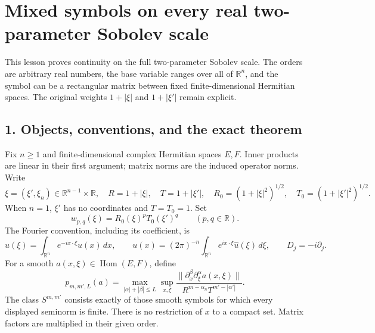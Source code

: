 \documentclass[
  11pt,
]{article}
\author{}
\date{}
\makeatletter
\let\ReaderOriginalAnchorStart\hyper@anchorstart
\let\ReaderOriginalAnchorEnd\hyper@anchorend
\let\ReaderPendingAliases\@empty
\def\ReaderArmAliases#1{\gdef\ReaderPendingAliases{#1}}
\def\hyper@anchorstart#1{\ReaderIfNativeAnchorTF{#1}{\ReaderPendingAliases\global\let\ReaderPendingAliases\@empty}{}\ReaderOriginalAnchorStart{#1}}
\makeatother
\begin{document}
\ReaderArmAliases{\ReaderOriginalAnchorStart{mixed-symbols-on-every-real-two-parameter-sobolev-scale}\ReaderOriginalAnchorEnd}
\section{Mixed symbols on every real two-parameter Sobolev
scale}\label{mixed-symbols-on-every-real-two-parameter-sobolev-scale}

This lesson proves continuity on the full two-parameter Sobolev scale.
The orders are arbitrary real numbers, the base variable ranges over all
of \(\mathbb R^n\), and the symbol can be a rectangular matrix between
fixed finite-dimensional Hermitian spaces. The original weights
\(1+|\xi|\) and \(1+|\xi'|\) remain explicit.

\ReaderArmAliases{\ReaderOriginalAnchorStart{AN03-MSB-001}\ReaderOriginalAnchorEnd\begingroup\expandafter\def\csname @currentHref\endcsname{AN03-MSB-001}\label{AN03-MSB-001}\endgroup\ReaderOriginalAnchorStart{an03-msb-001-objects-conventions-and-the-exact-theorem}\ReaderOriginalAnchorEnd\begingroup\expandafter\def\csname @currentHref\endcsname{an03-msb-001-objects-conventions-and-the-exact-theorem}\label{an03-msb-001-objects-conventions-and-the-exact-theorem}\endgroup\ReaderOriginalAnchorStart{1-objects-conventions-and-the-exact-theorem}\ReaderOriginalAnchorEnd\begingroup\expandafter\def\csname @currentHref\endcsname{1-objects-conventions-and-the-exact-theorem}\label{1-objects-conventions-and-the-exact-theorem}\endgroup}
\subsection{1. Objects, conventions, and the exact
theorem}\label{objects-conventions-and-the-exact-theorem}

Fix \(n\geq1\) and finite-dimensional complex Hermitian spaces \(E,F\).
Inner products are linear in their first argument; matrix norms are the
induced operator norms. Write \[
 \xi=(\xi',\xi_n)\in\mathbb R^{n-1}\times\mathbb R,
 \quad R=1+|\xi|,\quad T=1+|\xi'|,
 \quad R_0=(1+|\xi|^2)^{1/2},\quad T_0=(1+|\xi'|^2)^{1/2}.
 \tag{MSB1}
\] When \(n=1\), \(\xi'\) has no coordinates and \(T=T_0=1\). Set \[
 w_{p,q}(\xi)=R_0(\xi)^pT_0(\xi')^q\qquad(p,q\in\mathbb R).
 \tag{MSB2}
\] The Fourier convention, including its coefficient, is \[
 \widehat u(\xi)=\int_{\mathbb R^n}e^{-ix\cdot\xi}u(x)\,dx,
 \qquad u(x)=(2\pi)^{-n}\int_{\mathbb R^n}e^{ix\cdot\xi}\widehat u(\xi)\,d\xi,
 \qquad D_j=-i\partial_j.
 \tag{MSB3}
\] For a smooth \(a(x,\xi)\in\operatorname{Hom}(E,F)\), define \[
 p_{m,m',L}(a)=
 \max_{|\alpha|+|\beta|\leq L}\sup_{x,\xi}
 \frac{\|\partial_x^\beta\partial_\xi^\alpha a(x,\xi)\|}
 {R^{m-\alpha_n}T^{m'-|\alpha'|}}.
 \tag{MSB4}
\] The class \(S^{m,m'}\) consists exactly of those smooth symbols for
which every displayed seminorm is finite. There is no restriction of
\(x\) to a compact set. Matrix factors are multiplied in their given
order.
\end{document}
